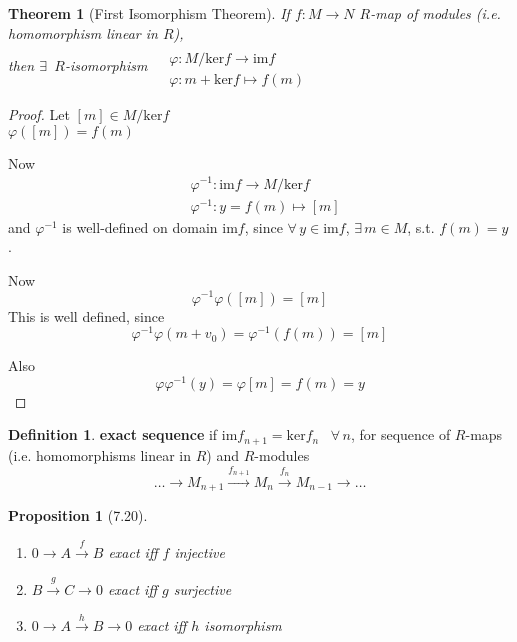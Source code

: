 \documentclass[twoside,landscape]{amsart}
\theoremstyle{plain}
\newtheorem{theorem}{Theorem}
\newtheorem{proposition}{Proposition}
\theoremstyle{definition}
\newtheorem{definition}{Definition}
\theoremstyle{remark}
\begin{document}
\begin{multicols*}{2}
\begin{theorem}[First Isomorphism Theorem]
  If $f:M\to N$ $R$-map of modules (i.e. homomorphism linear in $R$), \\
then $\exists \, $ $R$-isomorphism $\begin{aligned} & \quad \\
  & \varphi : M / \text{ker}{f} \to \text{im}{f} \\
  & \varphi : m + \text{ker}{f} \mapsto f(m) \end{aligned}$


\end{theorem}

\begin{proof}
Let $[m] \in M/\text{ker}{f}$ \\
\phantom{Let } $\varphi([m]) = f(m)$

Now 
\[
\begin{aligned}
  & \varphi^{-1} : \text{im}f \to M/\text{ker}f \\ 
  & \varphi^{-1}: y = f(m) \mapsto [m]
\end{aligned}
\]
and $\varphi^{-1}$ is well-defined on domain $\text{im}{f}$, since $\forall \, y \in \text{im}{f}$, $\exists \, m \in M$, s.t. $f(m)=y$.  

Now
\[
\varphi^{-1}\varphi([m]) = [m]
\]
This is well defined, since 
\[
\varphi^{-1}\varphi(m+v_0) = \varphi^{-1}(f(m)) = [m]
\]

Also
\[
\varphi \varphi^{-1}(y) = \varphi[m] = f(m) = y
\]
\end{proof}

\begin{definition}
  \textbf{exact sequence} if $\text{im}f_{n+1} = \text{ker}f_n$ \, $\forall \, n$, for sequence of $R$-maps (i.e. homomorphisms linear in $R$) and $R$-modules 
\[
\dots \to M_{n+1} \xrightarrow{ f_{n+1}} M_n \xrightarrow{ f_n} M_{n-1} \to \dots
\]
\end{definition}

\begin{proposition}[7.20]
  \begin{enumerate}
    \item[(i)] $0 \to A \xrightarrow{f} B$ exact iff $f$ injective 
    \item[(ii)] $B \xrightarrow{g} C \to 0$ exact iff $g$ surjective 
    \item[(iii)] $0 \to A \xrightarrow{h} B \to 0$ exact iff $h$ isomorphism
\end{enumerate}
\end{proposition}


\end{multicols*}
\end{document}
